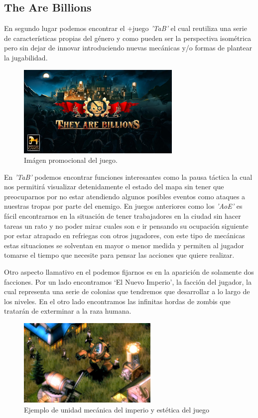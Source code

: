 \subsection{The Are Billions}
En segundo lugar podemos encontrar el +juego \textit{'\acf{TaB}'} el cual reutiliza
una serie de características propias del género y como pueden ser la perspectiva
isométrica pero sin dejar de innovar introduciendo nuevas mecánicas y/o formas de
plantear la jugabilidad.

\begin{figure}[ht]
\centering
\includegraphics[width=0.7\textwidth]{imagenes/marco_teo/referentes/tab_1.png}
\caption{Imágen promocional del juego.}
\label{img:tab_1}
\end{figure}
 
En \textit{'\ac{TaB}'} podemos encontrar funciones interesantes como la pausa
táctica la cual nos permitirá visualizar detenidamente el estado del mapa sin tener que
preocuparnos por no estar atendiendo algunos posibles eventos como ataques a nuestras
tropas por parte del enemigo. En juegos anteriores como los \textit{'\ac{AoE}'} es
fácil encontrarnos en la situación de tener trabajadores en la ciudad sin hacer tareas
un rato y no poder mirar cuales son e ir pensando su ocupación siguiente por estar
atrapado en refriegas con otros jugadores, con este tipo de mecánicas estas situaciones
se solventan en mayor o menor medida y permiten al jugador tomarse el tiempo que
necesite para pensar las acciones que quiere realizar.

Otro aspecto llamativo en el podemos fijarnos es en la aparición de solamente dos
facciones. Por un lado encontramos `El Nuevo Imperio', la facción del jugador, la
cual representa una serie de colonias que tendremos que desarrollar a lo largo de
los niveles. En el otro lado encontramos las infinitas hordas de zombis que tratarán
de exterminar a la raza humana.

\begin{figure}[ht]
\centering
\includegraphics[width=0.6\textwidth]{imagenes/marco_teo/referentes/tab_2.png}
\caption{Ejemplo de unidad mecánica del imperio y estética del juego}
\label{img:tab_2}
\end{figure}

